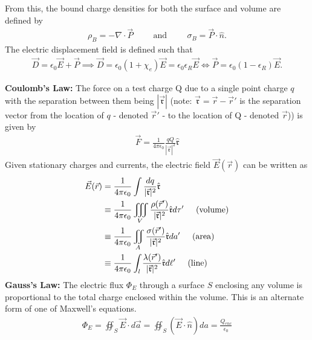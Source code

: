 From this, the bound charge densities for both the surface and volume are defined by
\begin{align}
	\rho_B = -\nabla \cdot \vec{P} \hspace{1cm}\textrm{and}\hspace{1cm}	\sigma_B = \vec{P} \cdot \hat{n}.
\end{align} 
The electric displacement field is defined such that
\begin{align}
	\vec{D} = \epsilon_0\vec{E}+\vec{P} \implies \vec{D} = \epsilon_0(1+\chi_e)\vec{E}=\epsilon_0 \epsilon_R \vec{E}\Longleftrightarrow \vec{P} = \epsilon_0(1-\epsilon_R)\vec{E}.
\end{align}
\begin{multicols}{2}
\textbf{Coulomb's Law:} The force on a test charge Q due to a single point charge $q$ with the separation between them being $|\vec{\mathfrak{r}}|$ (note: $\vec{\mathfrak{r}}=\vec{r}-\vec{r}'$ is the separation vector from the location of $q$ - denoted $\vec{r}'$ - to the location of Q - denoted $\vec{r}$)) is given by
\begin{align}
	\vec{F} = \frac{1}{4\pi\epsilon_0}\frac{qQ}{|\vec{\mathfrak{r}}|^2}\hat{\mathfrak{r}}
\end{align}
Given stationary charges and currents, the electric field $\vec{E}(\vec{r})$ can be written as
\begin{align}
	\vec{E}(\vec{r}) &= \frac{1}{4\pi\epsilon_0}\int \frac{dq}{|\vec{\mathfrak{r}}|^2}\hat{\mathfrak{r}} \\
	&\equiv \frac{1}{4\pi\epsilon_0}\iiint_V \frac{\rho(\vec{r}')}{|\vec{\mathfrak{r}}|^2}\hat{\mathfrak{r}}d\tau'\hspace{0.5cm}\textrm{(volume)}\\
	&\equiv \frac{1}{4\pi\epsilon_0}\iint_A \frac{\sigma(\vec{r}')}{|\vec{\mathfrak{r}}|^2}\hat{\mathfrak{r}}da'\hspace{0.5cm}\textrm{(area)}\\
	&\equiv \frac{1}{4\pi\epsilon_0}\int_l \frac{\lambda(\vec{r}')}{|\vec{\mathfrak{r}}|^2}\hat{\mathfrak{r}}d\ell'\hspace{0.5cm}\textrm{(line)}
\end{align}
\textbf{Gauss's Law:} The electric flux $\Phi_E$ through a surface $S$ enclosing any volume is proportional to the total charge enclosed within the volume. This is an alternate form of one of Maxwell's equations.
\begin{align}
	\Phi_E = \oiint_S \vec{E} \cdot d\vec{a} = \oiint_S (\vec{E} \cdot \hat{n}) da = \frac{Q_{enc}}{\epsilon_0}

\end{align}
\end{multicols}
